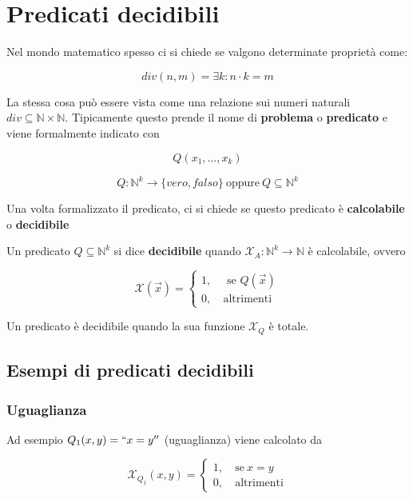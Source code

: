 
\section{Predicati decidibili}\label{predicati-decidibili}

Nel mondo matematico spesso ci si chiede se valgono determinate
proprietà come:

$$ div(n,m) = \exists k : n \cdot k =m$$

La stessa cosa può essere vista come una relazione sui numeri naturali
$div \subseteq \mathbb{N} \times \mathbb{N}$. Tipicamente questo prende il nome di
\textbf{problema} o \textbf{predicato} e viene formalmente indicato con

$$Q(x_1, \ldots , x_k)$$

$$Q : \mathbb{N}^k \rightarrow \{vero,falso\} \: \text{oppure} \: Q \subseteq \mathbb{N}^k $$

Una volta formalizzato il predicato, ci si chiede se questo predicato è
\textbf{calcolabile} o \textbf{decidibile}

Un predicato $Q \subseteq \mathbb{N}^k$ si dice \textbf{decidibile} quando
$\mathcal{X}_A : \mathbb{N}^k \rightarrow \mathbb{N}$ è calcolabile, ovvero 

$$\mathcal{X}(\vec{x}) = \begin{cases}
1, \:& \text{ se } Q(\vec{x}) \\
0, \:& \text{altrimenti}
\end{cases} $$

Un predicato è decidibile quando la sua funzione $\mathcal{X}_Q$ è totale.

\subsection{Esempi di predicati decidibili}\label{esempi-di-predicati-decidibili}

\subsubsection{Uguaglianza}\label{uguaglianza}

Ad esempio $Q_1(x,y) = ``x=y''$ (uguaglianza) viene calcolato da

$$\mathcal{X}_{Q_1}(x,y) = \begin{cases}
1, \:& \text{se}\: x=y\\
0, \:& \text{altrimenti}
\end{cases}$$ 

